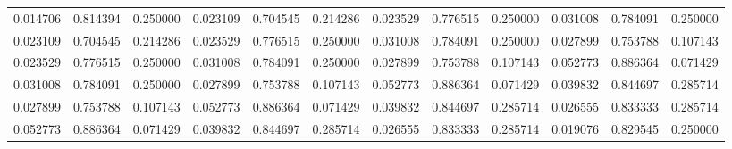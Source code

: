 \begin{longtable}{cccccccccccc}
  0.014706 &   0.814394 &   0.250000 &   0.023109 &   0.704545 &   0.214286 &   0.023529 &   0.776515 &   0.250000 & 0.031008 & 0.784091 & 0.250000 \\
  0.023109 &   0.704545 &   0.214286 &   0.023529 &   0.776515 &   0.250000 &   0.031008 &   0.784091 &   0.250000 & 0.027899 & 0.753788 & 0.107143 \\
  0.023529 &   0.776515 &   0.250000 &   0.031008 &   0.784091 &   0.250000 &   0.027899 &   0.753788 &   0.107143 & 0.052773 & 0.886364 & 0.071429 \\
  0.031008 &   0.784091 &   0.250000 &   0.027899 &   0.753788 &   0.107143 &   0.052773 &   0.886364 &   0.071429 & 0.039832 & 0.844697 & 0.285714 \\
  0.027899 &   0.753788 &   0.107143 &   0.052773 &   0.886364 &   0.071429 &   0.039832 &   0.844697 &   0.285714 & 0.026555 & 0.833333 & 0.285714 \\
  0.052773 &   0.886364 &   0.071429 &   0.039832 &   0.844697 &   0.285714 &   0.026555 &   0.833333 &   0.285714 & 0.019076 & 0.829545 & 0.250000 \\
\end{longtable}
